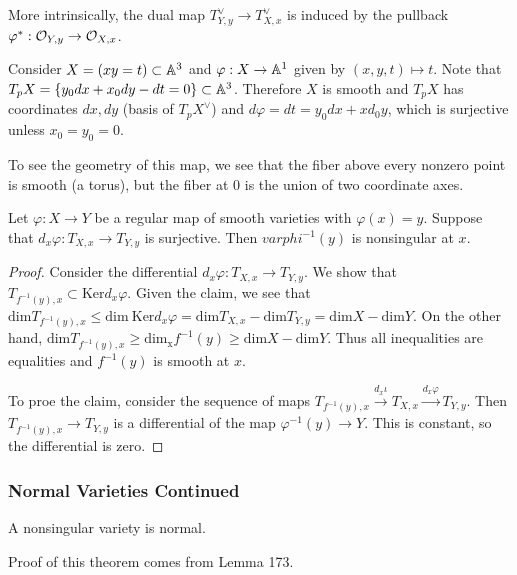 \documentclass[twoside, 10pt]{article}
\begin{document}
        More intrinsically, the dual map $T_{Y,y}^{\vee} \to T_{X,x}^{\vee}$ is
        induced by the pullback $\varphi^*: \mathcal{O}_{Y,y} \to \mathcal{O}_{X,x}$.

        \begin{exm} Consider $X = (xy=t) \subset \mathbb{A}^3$ and $\varphi:X \to \mathbb{A}^1$
            given by $(x,y,t) \mapsto t$. Note that $T_pX = \{y_0dx + x_0dy -
            dt = 0 \} \subset \mathbb{A}^3$. Therefore $X$ is smooth and $T_pX$ has
            coordinates $dx,dy$ (basis of $T_p X^{\vee}$) and $d\varphi = dt =
            y_0dx+xd_0y$, which is surjective unless $x_0=y_0=0$.

            To see the geometry of this map, we see that the fiber above every
        nonzero point is smooth (a torus), but the fiber at $0$ is the union of
    two coordinate axes.  \end{exm}

        \begin{lem} Let $\varphi:X \to Y$ be a regular map of smooth varieties
            with $\varphi(x) = y$. Suppose that $d_x \varphi: T_{X,x} \to
            T_{Y,y}$ is surjective. Then $varphi^{-1}(y)$ is nonsingular at
            $x$.  \begin{proof} Consider the differential $d_x \varphi: T_{X,x}
                \to T_{Y,y}$.  We show that $T_{f^{-1}(y),x} \subset
                \mathrm{Ker} d_x \varphi$. Given the claim, we see that
                $\mathrm{dim} T_{f^{-1}(y),x} \leq \mathrm{dim}\ \mathrm{Ker}
                d_x \varphi = \mathrm{dim} T_{X,x} - \mathrm{dim}T_{Y,y} =
                \mathrm{dim}X - \mathrm{dim}Y$. On the other hand,
                $\mathrm{dim}T_{f^{-1}(y),x} \geq \mathrm{dim_x} f^{-1}(y) \geq
                \mathrm{dim}X - \mathrm{dim}Y$. Thus all inequalities are
                equalities and $f^{-1}(y)$ is smooth at $x$.

                To proe the claim, consider the sequence of maps
                $T_{f^{-1}(y),x} \overset{d_x \iota}{\to} T_{X,x} \overset{d_x
                \varphi}{\to} T_{Y,y}$. Then $T_{f^{-1}(y),x} \to T_{Y,y}$ is a
                differential of the map $\varphi^{-1}(y) \to Y$. This is
            constant, so the differential is zero.  \end{proof} \end{lem}
        
        \subsubsection{Normal Varieties Continued} \begin{thm} A nonsingular
        variety is normal.  \end{thm} Proof of this theorem comes from Lemma
        173.
\end{document}
